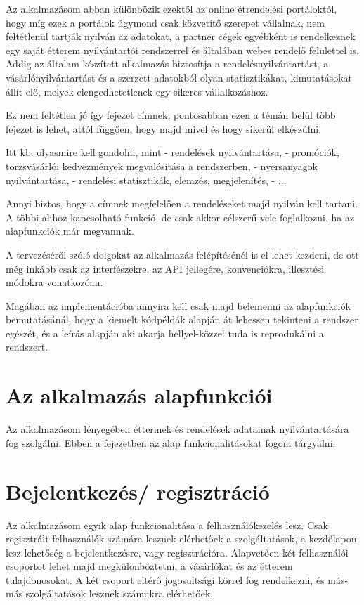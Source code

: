 Az alkalmazásom abban különbözik ezektől az online étrendelési portáloktól, hogy míg ezek a portálok úgymond csak közvetítő szerepet vállalnak, nem feltétlenül tartják nyilván az adatokat, a partner cégek egyébként is rendelkeznek egy saját étterem nyilvántartói rendszerrel és általában webes rendelő felülettel is. Addig az általam készített alkalmazás biztosítja a rendelésnyilvántartást, a vásárlónyilvántartást és a szerzett adatokból olyan statisztikákat, kimutatásokat állít elő, melyek elengedhetetlenek egy sikeres vállalkozáshoz.

Ez nem feltétlen jó így fejezet címnek, pontosabban ezen a témán belül több fejezet is lehet, attól függően, hogy majd mivel és hogy sikerül elkészülni.

Itt kb. olyasmire kell gondolni, mint
- rendelések nyilvántartása,
- promóciók, törzsvásárlói kedvezmények megvalósítása a rendszerben,
- nyersanyagok nyilvántartása,
- rendelési statisztikák, elemzés, megjelenítés,
- ...

Annyi biztos, hogy a címnek megfelelően a rendeléseket majd nyilván kell tartani. A többi ahhoz kapcsolható funkció, de csak akkor célszerű vele foglalkozni, ha az alapfunkciók már megvannak.

A tervezéséről szóló dolgokat az alkalmazás felépítésénél is el lehet kezdeni, de ott még inkább csak az interfészekre, az API jellegére, konvenciókra, illesztési módokra vonatkozóan.

Magában az implementációba annyira kell csak majd belemenni az alapfunkciók bemutatásánál, hogy a kiemelt kódpéldák alapján át lehessen tekinteni a rendszer egészét, és a leírás alapján aki akarja hellyel-közzel tuda is reprodukálni a rendszert.

\section{Az alkalmazás alapfunkciói}

Az alkalmazásom lényegében éttermek és rendelések adatainak nyilvántartására fog szolgálni. Ebben a fejezetben az alap funkcionalitásokat fogom tárgyalni.

\section{Bejelentkezés/ regisztráció}

Az alkalmazásom egyik alap funkcionalitása a felhasználókezelés lesz. Csak regisztrált felhasználók számára lesznek elérhetőek a szolgáltatások, a kezdőlapon lesz lehetőség a bejelentkezésre, vagy regisztrációra. Alapvetően két felhasználói csoportot lehet majd megkülönböztetni, a vásárlókat és az étterem tulajdonosokat. A két csoport eltérő jogosultsági körrel fog rendelkezni, és más-más szolgáltatások lesznek számukra elérhetőek.

